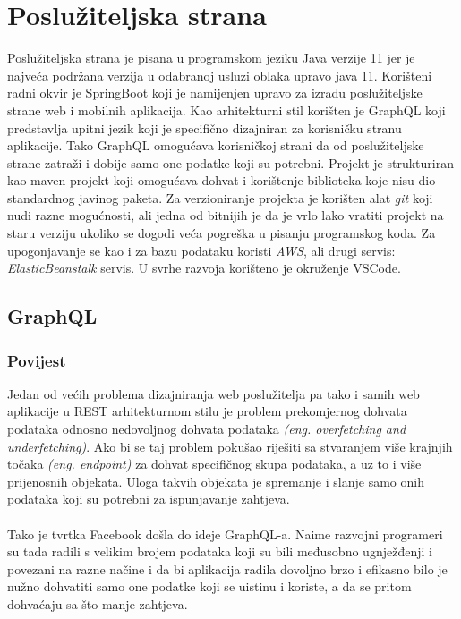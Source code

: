 \documentclass[times, utf8, zavrsni]{fer}
\begin{document}
\section{Poslužiteljska strana}
Poslužiteljska strana je pisana u programskom jeziku Java verzije 11 jer je najveća podržana verzija
u odabranoj usluzi oblaka upravo java 11. Korišteni radni okvir je
SpringBoot koji je namijenjen upravo za izradu poslužiteljske strane web i mobilnih aplikacija.
Kao arhitekturni stil korišten je GraphQL koji predstavlja upitni jezik koji je specifično dizajniran za korisničku stranu aplikacije.
Tako GraphQL omogućava korisničkoj strani da od poslužiteljske strane zatraži i dobije samo one podatke koji su potrebni.
Projekt je strukturiran kao maven projekt koji omogućava dohvat i korištenje biblioteka koje nisu
dio standardnog javinog paketa.
Za verzioniranje projekta je korišten alat \textit{git} koji nudi razne mogućnosti, ali jedna od
bitnijih je da je vrlo lako vratiti projekt na staru verziju
ukoliko se dogodi veća pogreška u pisanju programskog koda. Za upogonjavanje
se kao i za bazu podataku koristi \textit{AWS}, ali drugi servis: \textit{ElasticBeanstalk} servis.
U svrhe razvoja korišteno je okruženje VSCode.

\subsection{GraphQL}

\subsubsection{Povijest}
Jedan od većih problema dizajniranja web poslužitelja pa tako i samih web aplikacije u REST
arhitekturnom stilu je problem prekomjernog dohvata podataka odnosno nedovoljnog dohvata podataka
\textit{(eng. overfetching and underfetching)}. Ako bi se taj problem pokušao riješiti sa
stvaranjem više krajnjih točaka \textit{(eng. endpoint)} za dohvat specifičnog skupa podataka,
a uz to i više prijenosnih objekata.
Uloga takvih objekata je spremanje i slanje samo onih podataka koji su potrebni za ispunjavanje zahtjeva.
\\\\
Tako je tvrtka Facebook došla
do ideje GraphQL-a. Naime razvojni programeri su tada radili s velikim brojem podataka koji su
bili međusobno ugnježđenji i povezani na razne načine i da bi aplikacija radila dovoljno brzo
i efikasno bilo je nužno dohvatiti samo one podatke koji se uistinu i koriste, a da se pritom dohvaćaju sa
što manje zahtjeva.
\end{document}
